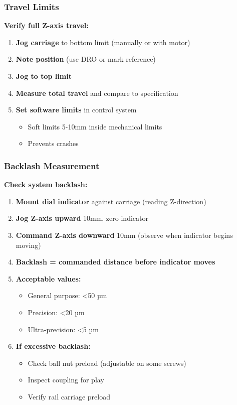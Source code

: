 \documentclass[
]{article}
\providecommand{\tightlist}{%
  \setlength{\itemsep}{0pt}\setlength{\parskip}{0pt}}
\begin{document}
\subsubsection{Travel Limits}\label{travel-limits}

\textbf{Verify full Z-axis travel:}

\begin{enumerate}
\def\labelenumi{\arabic{enumi}.}
\tightlist
\item
  \textbf{Jog carriage} to bottom limit (manually or with motor)
\item
  \textbf{Note position} (use DRO or mark reference)
\item
  \textbf{Jog to top limit}
\item
  \textbf{Measure total travel} and compare to specification
\item
  \textbf{Set software limits} in control system

  \begin{itemize}
  \tightlist
  \item
    Soft limits 5-10mm inside mechanical limits
  \item
    Prevents crashes
  \end{itemize}
\end{enumerate}

\subsubsection{Backlash Measurement}\label{backlash-measurement}

\textbf{Check system backlash:}

\begin{enumerate}
\def\labelenumi{\arabic{enumi}.}
\tightlist
\item
  \textbf{Mount dial indicator} against carriage (reading Z-direction)
\item
  \textbf{Jog Z-axis upward} 10mm, zero indicator
\item
  \textbf{Command Z-axis downward} 10mm (observe when indicator begins
  moving)
\item
  \textbf{Backlash = commanded distance before indicator moves}
\item
  \textbf{Acceptable values:}

  \begin{itemize}
  \tightlist
  \item
    General purpose: \textless50 µm
  \item
    Precision: \textless20 µm
  \item
    Ultra-precision: \textless5 µm
  \end{itemize}
\item
  \textbf{If excessive backlash:}

  \begin{itemize}
  \tightlist
  \item
    Check ball nut preload (adjustable on some screws)
  \item
    Inspect coupling for play
  \item
    Verify rail carriage preload
  \end{itemize}
\end{enumerate}
\end{document}

